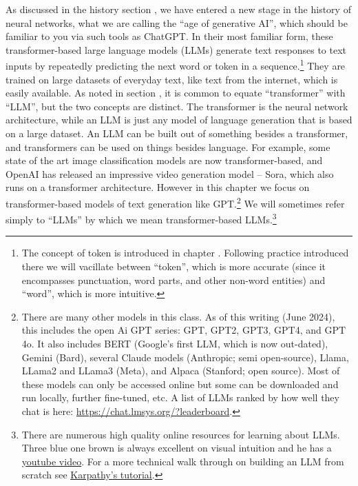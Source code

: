 As discussed in the history section , we have entered a new stage in the history of neural networks, what we are calling the ``age of generative AI'', which should be familiar to you via such tools as ChatGPT. In their most familiar form, these transformer-based large language models (LLMs) generate text responses to text inputs by repeatedly predicting the next word or token in a sequence.\footnote{The concept of token is introduced in chapter . Following practice introduced there we will vacillate between ``token'', which is more accurate (since it encompasses punctuation, word parts, and other non-word entities) and ``word'', which is more intuitive.} They are trained on large datasets of everyday text, like text from the internet, which is easily available. As noted in section , it is common to equate ``transformer'' with ``LLM'', but the two concepts are distinct. The transformer is the neural network architecture, while an LLM is just any model of language generation that is based on a large dataset. An LLM can be built out of something besides a transformer, and transformers can be used on things besides language. For example, some state of the art image classification models are now transformer-based, and OpenAI has released an impressive video generation model – Sora, which also runs on a transformer architecture. However in this chapter we focus on transformer-based models of text generation like GPT.\footnote{There are many other models in this class. As of this writing (June 2024), this includes the open Ai GPT series: GPT, GPT2, GPT3, GPT4, and GPT 4o. It also includes BERT (Google’s first LLM, which is now out-dated), Gemini (Bard), several Claude models (Anthropic;  semi open-source), Llama, LLama2 and LLama3 (Meta), and Alpaca (Stanford; open source). Most of these models can only be accessed online but some can be downloaded and run locally, further fine-tuned, etc. A list of LLMs ranked by how well they chat is here: \url{https://chat.lmsys.org/?leaderboard}.} We will sometimes refer simply to ``LLMs'' by which we mean transformer-based LLMs.\footnote{There are numerous high quality online resources for learning about LLMs. Three blue one brown is always excellent on visual intuition and he has a \href{https://www.youtube.com/watch?v=wjZofJX0v4M&list=PLZHQObOWTQDNU6R1_67000Dx_ZCJB-3pi}{\underline{youtube video}}. For a more technical walk through on building an LLM from scratch see \href{https://www.youtube.com/watch?v=kCc8FmEb1nY}{\underline{Karpathy's tutorial}}.}

